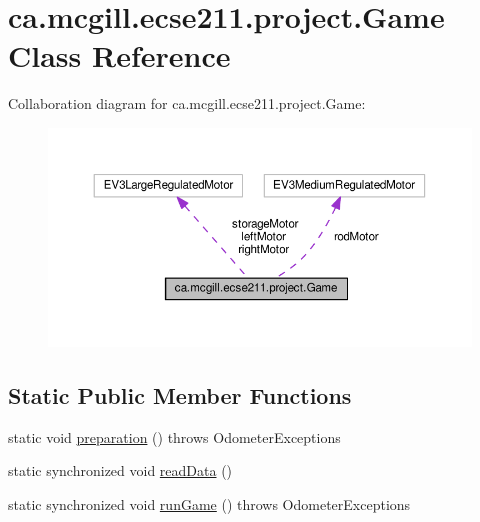 \hypertarget{classca_1_1mcgill_1_1ecse211_1_1project_1_1_game}{}\section{ca.\+mcgill.\+ecse211.\+project.\+Game Class Reference}
\label{classca_1_1mcgill_1_1ecse211_1_1project_1_1_game}


Collaboration diagram for ca.\+mcgill.\+ecse211.\+project.\+Game\+:
\nopagebreak
\begin{figure}[H]
\begin{center}
\leavevmode
\includegraphics[width=350pt]{classca_1_1mcgill_1_1ecse211_1_1project_1_1_game__coll__graph}
\end{center}
\end{figure}
\subsection*{Static Public Member Functions}
\begin{DoxyCompactItemize}
\item 
static void \hyperlink{classca_1_1mcgill_1_1ecse211_1_1project_1_1_game_a1bcbd1c19309c65a6887ae19bde66765}{preparation} ()  throws Odometer\+Exceptions 
\item 
static synchronized void \hyperlink{classca_1_1mcgill_1_1ecse211_1_1project_1_1_game_aff9431d27d78c8b228f468d8ad889a9a}{read\+Data} ()
\item 
static synchronized void \hyperlink{classca_1_1mcgill_1_1ecse211_1_1project_1_1_game_a790740a4ed299c9b985401ea8c4d5010}{run\+Game} ()  throws Odometer\+Exceptions 
\end{DoxyCompactItemize}

